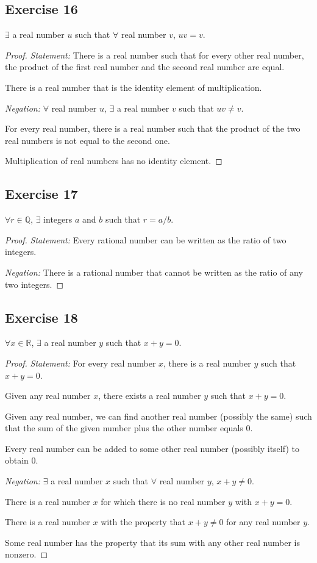 \documentclass[14pt]{extarticle}
\newcommand{\R}{\mathbb{R}}
\newcommand{\Q}{\mathbb{Q}}
\newcommand{\fa}{\forall}
\newcommand{\te}{\exists}
\begin{document}
\subsection{Exercise 16}
$\te$ a real number $u$ such that $\fa$ real number $v$, $uv = v$.

\begin{proof}
{\it Statement:} There is a real number such that for every other real number, the product of the first real number and the second real number are equal.

There is a real number that is the identity element of multiplication. 

{\it Negation:} $\fa$ real number $u$, $\te$ a real number $v$ such that $uv \neq v$.

For every real number, there is a real number such that the product of the two real numbers is not equal to the second one.

Multiplication of real numbers has no identity element.
\end{proof}

\subsection{Exercise 17}
$\fa r \in \Q$, $\te$ integers $a$ and $b$ such that $r = a/b$.

\begin{proof}
{\it Statement:} Every rational number can be written as the ratio of two integers.

{\it Negation:} There is a rational number that cannot be written as the ratio of any two integers.
\end{proof}

\subsection{Exercise 18}
$\fa x \in \R$, $\te$ a real number $y$ such that $x + y = 0$.

\begin{proof}
{\it Statement:}
For every real number $x$, there is a real number $y$ such that $x + y = 0$.

Given any real number $x$, there exists a real number $y$ such that $x + y = 0$.

Given any real number, we can find another real number (possibly the same) such that the sum of the given number plus the other number equals 0.

Every real number can be added to some other real number (possibly itself) to obtain 0.

{\it Negation:} $\te$ a real number $x$ such that $\fa$ real number $y$, $x + y \neq 0$.

There is a real number $x$ for which there is no real number $y$ with $x + y = 0$.

There is a real number $x$ with the property that $x + y \neq 0$ for any real number $y$.

Some real number has the property that its sum with any other real number is nonzero.
\end{proof}
\end{document}
